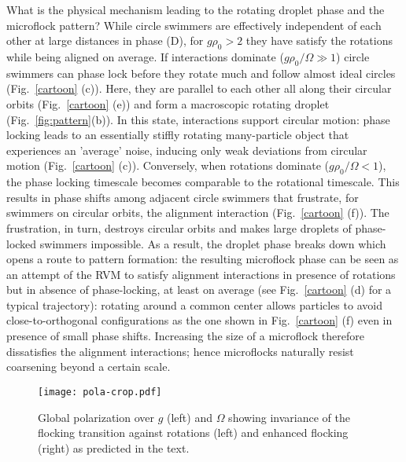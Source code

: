 \documentclass[aps,twocolumn,showlabels,showrefs,amsmath,amssymb,pre,superscriptaddress, floatfix, colors]{revtex4}
\newcommand{\1}{\begin{equation}}
\newcommand{\2}{\end{equation}}
\newcommand{\4}[2]{{\frac{#1}{#2}}}
\begin{document}
What is the physical mechanism leading to the rotating droplet phase and the microflock pattern?
While circle swimmers are effectively independent of each other at large distances in phase (D), 
for $g\rho_0>2$ they have satisfy the rotations while being aligned on average. 
If interactions dominate ($g\rho_0/\Omega \gg 1$) circle swimmers can phase lock before they rotate much and follow almost ideal circles (Fig.~\ref{cartoon} (c)). Here, 
they are parallel to each other all along their circular orbits (Fig.~\ref{cartoon} (e)) and form a macroscopic rotating droplet (Fig.~\ref{fig:pattern}(b)).
In this state, interactions support circular motion: phase locking leads to an essentially stiffly rotating many-particle object that experiences an 'average' noise,
inducing only weak deviations from circular motion (Fig.~\ref{cartoon} (c)).
Conversely, when rotations dominate ($g\rho_0/\Omega < 1$), 
the phase locking timescale
becomes comparable to the rotational timescale. 
This results in phase shifts among adjacent circle swimmers that frustrate, for swimmers on circular orbits, the alignment interaction (Fig.~\ref{cartoon} (f)). 
The frustration, in turn, destroys circular orbits and makes large droplets of phase-locked swimmers impossible.
As a result, the droplet phase breaks down which opens a route to pattern formation: the resulting microflock phase can be seen as an 
attempt of the RVM to satisfy alignment interactions in presence of rotations but in absence of phase-locking, at least on average (see Fig.~\ref{cartoon} (d) for a typical trajectory):
rotating around a common center allows particles to avoid close-to-orthogonal configurations as the one shown in Fig.~\ref{cartoon} (f) even in 
presence of small phase shifts. 
Increasing the size of a microflock therefore dissatisfies the alignment interactions; hence microflocks naturally resist coarsening beyond a certain scale. 



\begin{figure}
\begin{center}
\texttt{[image: pola-crop.pdf]}
\end{center}
\caption{\small 
Global polarization over $g$ (left) and $\Omega$ showing invariance of the flocking transition against rotations (left) and enhanced flocking (right) as predicted in the text.}
\label{fig:flocking}
\end{figure}
\end{document}

